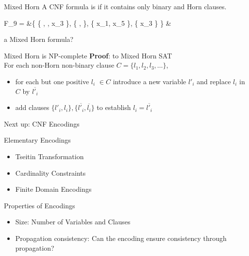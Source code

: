 \documentclass[t]{sdqbeamer}
\begin{document}
\begin{frame}{Mixed Horn}
	A CNF formula is  if it contains only binary and Horn clauses.
	\begin{example}
		\vspace*{-3ex}
		\begin{flalign*}
			F_9 = &\{ \{ , , x_3 \}, \{ ,  \}, \{ x_1, x_5 \}, \{ x_3 \} \} &
		\end{flalign*}
	\end{example}
	 a Mixed Horn formula? 
	\pause
	\begin{block}{Mixed Horn is NP-complete}
		\textbf{Proof}:  to Mixed Horn SAT\\[1ex]
		For each non-Horn non-binary clause $C=\{l_1, l_2, l_3, \dots\}$, 
		\begin{itemize}\setlength{\itemsep}{1ex}
			\item for each but one positive $l_i$ $\in C$ introduce a new variable $l'_i$ and replace $l_i$ in $C$ by $\overline{l'_i}$
			\item add clauses $\{ l'_i, l_i \}, \{ \overline{l'_i}, \overline{l_i} \}$ to establish $l_i = \overline{l'_i}$
		\end{itemize}
	\end{block}
\end{frame}

\begin{frame}{Next up: CNF Encodings}
	\begin{block}{Elementary Encodings}
		\begin{itemize}\setlength{\itemsep}{1ex}
			\item Tseitin Transformation
			\item Cardinality Constraints
			\item Finite Domain Encodings
		\end{itemize}
	\end{block}
	\begin{block}{Properties of Encodings}
		\begin{itemize}\setlength{\itemsep}{1ex}
			\item Size: Number of Variables and Clauses
			\item Propagation consistency: Can the encoding ensure consistency through propagation?
		\end{itemize}
	\end{block}
\end{frame}
\end{document}

